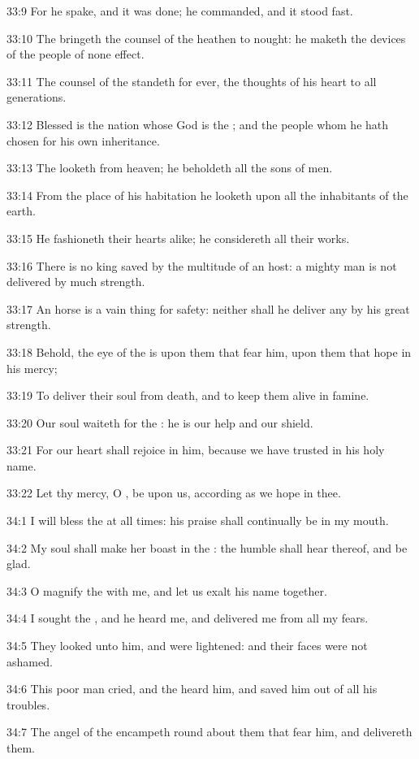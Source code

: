 33:9 For he spake, and it was done; he commanded, and it stood fast.

33:10 The \LORD bringeth the counsel of the heathen to nought: he maketh the devices of the people of none effect.

33:11 The counsel of the \LORD standeth for ever, the thoughts of his heart to all generations.

33:12 Blessed is the nation whose God is the \LORD; and the people whom he hath chosen for his own inheritance.

33:13 The \LORD looketh from heaven; he beholdeth all the sons of men.

33:14 From the place of his habitation he looketh upon all the inhabitants of the earth.

33:15 He fashioneth their hearts alike; he considereth all their works.

33:16 There is no king saved by the multitude of an host: a mighty man is not delivered by much strength.

33:17 An horse is a vain thing for safety: neither shall he deliver any by his great strength.

33:18 Behold, the eye of the \LORD is upon them that fear him, upon them that hope in his mercy;

33:19 To deliver their soul from death, and to keep them alive in famine.

33:20 Our soul waiteth for the \LORD: he is our help and our shield.

33:21 For our heart shall rejoice in him, because we have trusted in his holy name.

33:22 Let thy mercy, O \LORD, be upon us, according as we hope in thee.



34:1 I will bless the \LORD at all times: his praise shall continually be in my mouth.

34:2 My soul shall make her boast in the \LORD: the humble shall hear thereof, and be glad.

34:3 O magnify the \LORD with me, and let us exalt his name together.

34:4 I sought the \LORD, and he heard me, and delivered me from all my fears.

34:5 They looked unto him, and were lightened: and their faces were not ashamed.

34:6 This poor man cried, and the \LORD heard him, and saved him out of all his troubles.

34:7 The angel of the \LORD encampeth round about them that fear him, and delivereth them.


